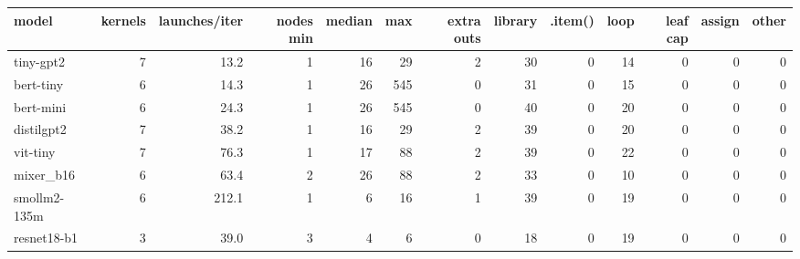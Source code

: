 \begin{tabular}{lrrrrrrrrrrrr}
\toprule
model & kernels & launches/iter & nodes min & median & max & extra outs & library & .item() & loop & leaf cap & assign & other \\
\midrule
tiny-gpt2 & 7 & 13.2 & 1 & 16 & 29 & 2 & 30 & 0 & 14 & 0 & 0 & 0 \\
bert-tiny & 6 & 14.3 & 1 & 26 & 545 & 0 & 31 & 0 & 15 & 0 & 0 & 0 \\
bert-mini & 6 & 24.3 & 1 & 26 & 545 & 0 & 40 & 0 & 20 & 0 & 0 & 0 \\
distilgpt2 & 7 & 38.2 & 1 & 16 & 29 & 2 & 39 & 0 & 20 & 0 & 0 & 0 \\
vit-tiny & 7 & 76.3 & 1 & 17 & 88 & 2 & 39 & 0 & 22 & 0 & 0 & 0 \\
mixer\_b16 & 6 & 63.4 & 2 & 26 & 88 & 2 & 33 & 0 & 10 & 0 & 0 & 0 \\
smollm2-135m & 6 & 212.1 & 1 & 6 & 16 & 1 & 39 & 0 & 19 & 0 & 0 & 0 \\
resnet18-b1 & 3 & 39.0 & 3 & 4 & 6 & 0 & 18 & 0 & 19 & 0 & 0 & 0 \\
\bottomrule
\end{tabular}
